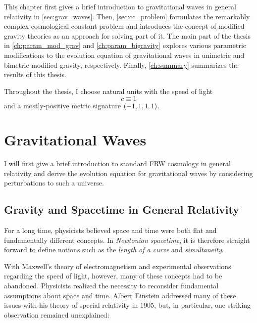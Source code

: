 \documentclass[12pt,parskip=half]{scrreprt}
\begin{document}
This chapter first gives a brief introduction to gravitational waves in general relativity in \autoref{sec:grav_waves}. Then, \autoref{sec:cc_problem} formulates the remarkably complex cosmological constant problem and introduces the concept of modified gravity theories as an approach for solving part of it. The main part of the thesis in \autoref{ch:param_mod_grav} and \autoref{ch:param_bigravity} explores various parametric modifications to the evolution equation of gravitational waves in unimetric and bimetric modified gravity, respectively. Finally, \autoref{ch:summary} summarizes the results of this thesis.

Throughout the thesis, I choose natural units with the speed of light
\begin{equation}
	c \equiv 1
\end{equation}
and a mostly-positive metric signature \(\del{-1,1,1,1}\).


\section{Gravitational Waves}\label{sec:grav_waves}

I will first give a brief introduction to standard FRW cosmology in general relativity and derive the evolution equation for gravitational waves by considering perturbations to such a universe.

\subsection{Gravity and Spacetime in General Relativity}\label{sec:gr}

For a long time, physicists believed space and time were both flat and fundamentally different concepts. In \emph{Newtonian spacetime}, it is therefore straight forward to define notions such as the \emph{length of a curve} and \emph{simultaneity}. 

With Maxwell's theory of electromagnetism and experimental observations regarding the speed of light, however, many of these concepts had to be abandoned. Physicists realized the necessity to reconsider fundamental assumptions about space and time. Albert Einstein addressed many of these issues with his theory of special relativity  in 1905, but, in particular, one striking observation remained unexplained:
\end{document}
